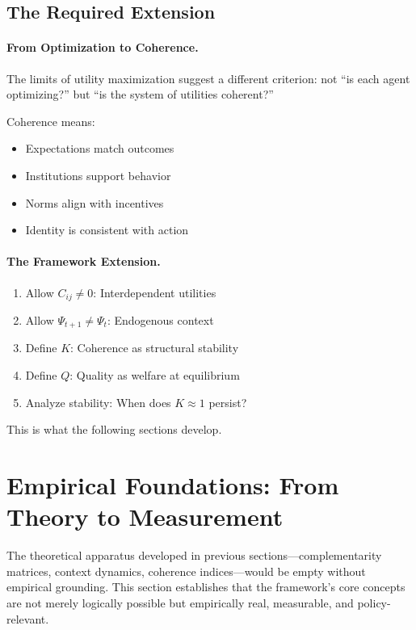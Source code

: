 \documentclass[12pt,a4paper]{article}
\begin{document}
\subsection{The Required Extension}

\paragraph{From Optimization to Coherence.}
The limits of utility maximization suggest a different criterion:
not ``is each agent optimizing?'' but ``is the system of utilities coherent?''

Coherence means:
\begin{itemize}
  \item Expectations match outcomes
  \item Institutions support behavior
  \item Norms align with incentives
  \item Identity is consistent with action
\end{itemize}

\paragraph{The Framework Extension.}
\begin{enumerate}
  \item Allow $C_{ij} \neq 0$: Interdependent utilities
  \item Allow $\Psi_{t+1} \neq \Psi_t$: Endogenous context
  \item Define $K$: Coherence as structural stability
  \item Define $Q$: Quality as welfare at equilibrium
  \item Analyze stability: When does $K \approx 1$ persist?
\end{enumerate}

This is what the following sections develop.

\section{Empirical Foundations: From Theory to Measurement}
\label{sec:empiricalfoundations}

The theoretical apparatus developed in previous sections---complementarity matrices,
context dynamics, coherence indices---would be empty without empirical grounding.
This section establishes that the framework's core concepts are not merely
logically possible but empirically real, measurable, and policy-relevant.
\end{document}
